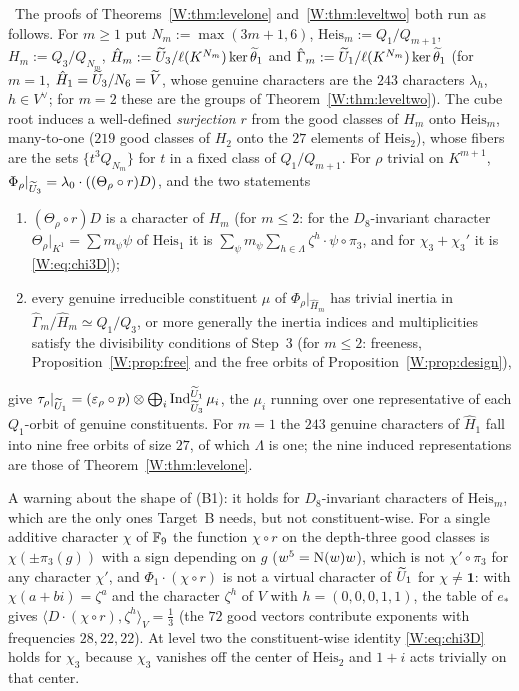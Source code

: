 \Otag\ The proofs of Theorems~\ref{W:thm:levelone} and~\ref{W:thm:leveltwo}
both run as follows.  For $m\ge1$ put $N_m:=\max(3m+1,6)$,
$\mathrm{Heis}_m:=Q_1/Q_{m+1}$, $H_m:=Q_3/Q_{N_m}$,
$\hat H_m:=\widetilde U_3/\ell(K^{N_m})\ker\widetilde\theta_1$ and
$\hat\Gamma_m:=\widetilde U_1/\ell(K^{N_m})\ker\widetilde\theta_1$ (for $m=1$, $\hat H_1=\widetilde U_3/N_6=\widetilde V$,
whose genuine characters are the $243$ characters $\lambda_h$,
$h\in V^\vee$; for $m=2$ these are the groups of
Theorem~\ref{W:thm:leveltwo}).  The cube root induces a well-defined
\emph{surjection} $r$ from the good classes of $H_m$ onto
$\mathrm{Heis}_m$, many-to-one ($219$ good classes of $H_2$ onto the
$27$ elements of $\mathrm{Heis}_2$), whose fibers are the sets
$\{t^3Q_{N_m}\}$ for $t$ in a fixed class of $Q_1/Q_{m+1}$.  For
$\rho$ trivial on $K^{m+1}$, $\Phi_\rho|_{\widetilde U_3}=\lambda_0\cdot((\Theta_\rho\circ r)D)$,
and the two statements
\begin{enumerate}[label=(B\arabic*)]
\item $(\Theta_\rho\circ r)D$ is a character of $H_m$ (for $m\le2$: for
the $D_8$-invariant character $\Theta_\rho|_{K^1}=\sum m_\psi\psi$ of
$\mathrm{Heis}_1$ it is $\sum_\psi m_\psi\sum_{h\in\Lambda}\zeta^h\cdot\psi\circ\pi_3$,
and for $\chi_3+\chi_3'$ it is \eqref{W:eq:chi3D});
\item every genuine irreducible constituent $\mu$ of $\Phi_\rho|_{\hat H_m}$
has trivial inertia in $\hat\Gamma_m/\hat H_m\simeq Q_1/Q_3$, or more
generally the inertia indices and multiplicities satisfy the
divisibility conditions of Step~3 (for $m\le2$: freeness,
Proposition~\ref{W:prop:free} and the free orbits of
Proposition~\ref{W:prop:design}),
\end{enumerate}
give $\tau_\rho|_{\widetilde U_1}=(\varepsilon_\rho\circ p)\otimes\bigoplus_i\operatorname{Ind}_{\widetilde U_3}^{\widetilde U_1}\mu_i$,
the $\mu_i$ running over one representative of each $Q_1$-orbit of
genuine constituents.  For $m=1$ the $243$ genuine characters of
$\hat H_1$ fall into nine free orbits of size $27$, of which $\Lambda$
is one; the nine induced representations are those of
Theorem~\ref{W:thm:levelone}.

A warning about the shape of (B1): it holds for $D_8$-invariant
characters of $\mathrm{Heis}_m$, which are the only ones Target~B needs,
but not constituent-wise.  For a single additive character $\chi$ of
$\mathbb F_9$ the function $\chi\circ r$ on the depth-three good classes is
$\chi(\pm\pi_3(g))$ with a sign depending on $g$ ($w^5=\operatorname N(w)w$), which
is not $\chi'\circ\pi_3$ for any character $\chi'$, and
$\Phi_1\cdot(\chi\circ r)$ is not a virtual character of $\widetilde U_1$ for
$\chi\ne\mathbf1$: with $\chi(a+bi)=\zeta^a$ and the character $\zeta^{h}$
of $V$ with $h=(0,0,0,1,1)$, the table of $e_*$ gives
$\langle D\cdot(\chi\circ r),\zeta^h\rangle_V=\tfrac13$ (the $72$ good
vectors contribute exponents with frequencies $28,22,22$).  At level two
the constituent-wise identity \eqref{W:eq:chi3D} holds for $\chi_3$
because $\chi_3$ vanishes off the center of $\mathrm{Heis}_2$ and
$1+i$ acts trivially on that center.

